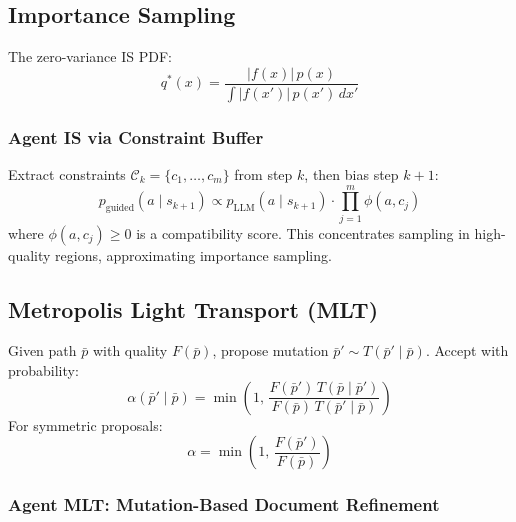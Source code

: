 \documentclass[11pt,twocolumn]{article}
\theoremstyle{definition}
\newcommand{\pLLM}{p_{\text{LLM}}}
\begin{document}
\subsection{Importance Sampling}\label{sec:is}

The zero-variance IS PDF:
\begin{equation}\label{eq:optimal-is}
  q^*(x) = \frac{|f(x)|\,p(x)}{\int |f(x')|\,p(x')\,dx'}
\end{equation}

\subsubsection{Agent IS via Constraint Buffer}

Extract constraints $\mathcal{C}_k = \{c_1, \ldots, c_m\}$ from step $k$,
then bias step $k{+}1$:
\begin{equation}\label{eq:guided}
  p_{\text{guided}}(a \mid s_{k+1})
    \propto \pLLM(a \mid s_{k+1}) \cdot \prod_{j=1}^{m} \phi(a, c_j)
\end{equation}
where $\phi(a, c_j) \geq 0$ is a compatibility score.
This concentrates sampling in high-quality regions,
approximating importance sampling.

\subsection{Metropolis Light Transport (MLT)}\label{sec:mlt}

Given path $\bar{p}$ with quality $F(\bar{p})$,
propose mutation $\bar{p}' \sim T(\bar{p}' \mid \bar{p})$.
Accept with \citet{metropolis1953equation,hastings1970monte} probability:
\begin{equation}\label{eq:mh}
  \alpha(\bar{p}' \mid \bar{p})
    = \min\!\left(1,\,
      \frac{F(\bar{p}')\,T(\bar{p} \mid \bar{p}')}{F(\bar{p})\,T(\bar{p}' \mid \bar{p})}
    \right)
\end{equation}
For symmetric proposals:
\begin{equation}\label{eq:mh-symmetric}
  \alpha = \min\!\left(1,\,\frac{F(\bar{p}')}{F(\bar{p})}\right)
\end{equation}

\subsubsection{Agent MLT: Mutation-Based Document Refinement}
\end{document}
